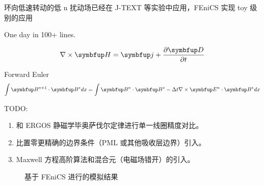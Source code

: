 环向低速转动的低 n 扰动场已经在 J-TEXT 等实验中应用，FEniCS 实现 toy 级别的应用
    
One day in 100+ lines.

\begin{equation}
  \nabla \times\vect{H} = \vect{j}+\frac{\partial \vect{D}}{\partial t} 
\end{equation}

Forward Euler
\begin{equation}
  \int \vect{B}^{n+1}\cdot\vect{B}^* dx =\int \vect{B}^n\cdot \vect{B}^* - \Delta t  \nabla\times\vect{E}^n\cdot\vect{B}^* dx
\end{equation}

TODO:
\begin{enumerate}
  \item 和 ERGOS 静磁学毕奥萨伐尔定律进行单一线圈精度对比。
  \item 比置零更精确的边界条件（PML 或其他吸收层边界）引入。
  \item Maxwell 方程高阶算法和混合元（电磁场错开）的引入。
\end{enumerate}




\begin{figure}[t]
\centering
{}\hfill
{}%
\label{fig:highm-pos}
\caption{基于 FEniCS 进行的模拟结果}
\end{figure}

